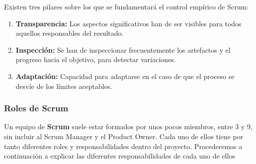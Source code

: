 \newpage
Existen tres pilares sobre los que se fundamentará el control empírico de Scrum:

\begin{enumerate}
	\item \textbf{Transparencia:} Los aspectos significativos han de ser visibles para todos aquellos responsables del resultado.
	\item \textbf{Inspección:} Se han de inspeccionar frecuentemente los artefactos y el progreso hacia el objetivo, para detectar variaciones.
	\item \textbf{Adaptación:}  Capacidad para adaptarse en el caso de que el proceso se desvíe de los límites aceptables.
\end{enumerate}

\subsubsection{Roles de Scrum}

Un equipo de \textbf{Scrum} suele estar formados por unos pocos miembros, entre 3 y 9, sin incluir al Scrum Manager y el Product Owner. Cada uno de ellos tiene por tanto diferentes roles y responsabilidades dentro del proyecto. Procederemos a continuación a explicar las diferentes responsabilidades de cada uno de ellos

